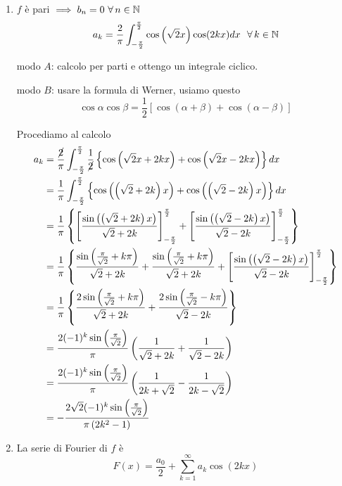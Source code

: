 \begin{enumerate}
\item $f$ è pari $\implies b_{n} = 0\ \forall n\in \NN $\begin{equation*}
a_{k} = \frac{2}{\pi }\int ^{\frac{\pi }{2}}_{ - \frac{\pi }{2}}\cos\left(\sqrt{2} x\right)\cos(2kx) dx\ \ \forall k\in \NN 
\end{equation*}

modo $A$: calcolo per parti e ottengo un integrale ciclico.

modo $B$: usare la formula di Werner, usiamo questo\begin{equation*}
\cos \alpha \cos \beta = \frac{1}{2}[\cos(\alpha + \beta) + \cos(\alpha - \beta)]
\end{equation*}

Procediamo al calcolo\begin{align*}
a_{k} & = \frac{\cancel{2}}{\pi }\int ^{\frac{\pi }{2}}_{ - \frac{\pi }{2}}\frac{1}{\cancel{2}}\left\{\cos\left(\sqrt{2} x + 2kx\right) + \cos\left(\sqrt{2} x - 2kx\right)\right\} dx\\
 & = \frac{1}{\pi }\int ^{\frac{\pi }{2}}_{ - \frac{\pi }{2}}\left\{\cos\left(\left(\sqrt{2} + 2k\right) x\right) + \cos\left(\left(\sqrt{2} - 2k\right) x\right)\right\} dx\\
 & = \frac{1}{\pi }\left\{\left[\frac{\sin\left(\left(\sqrt{2} + 2k\right) x\right)}{\sqrt{2} + 2k}\right]^{\frac{\pi }{2}}_{ - \frac{\pi }{2}} + \left[\frac{\sin\left(\left(\sqrt{2} - 2k\right) x\right)}{\sqrt{2} - 2k}\right]^{\frac{\pi }{2}}_{ - \frac{\pi }{2}}\right\}\\
 & = \frac{1}{\pi }\left\{\frac{\sin\left(\frac{\pi }{\sqrt{2}} + k\pi \right)}{\sqrt{2} + 2k} + \frac{\sin\left(\frac{\pi }{\sqrt{2}} + k\pi \right)}{\sqrt{2} + 2k} + \left[\frac{\sin\left(\left(\sqrt{2} - 2k\right) x\right)}{\sqrt{2} - 2k}\right]^{\frac{\pi }{2}}_{ - \frac{\pi }{2}}\right\}\\
 & = \frac{1}{\pi }\left\{\frac{2\sin\left(\frac{\pi }{\sqrt{2}} + k\pi \right)}{\sqrt{2} + 2k} + \frac{2\sin\left(\frac{\pi }{\sqrt{2}} - k\pi \right)}{\sqrt{2} - 2k}\right\}\\
 & = \frac{2(- 1)^{k}\sin\left(\frac{\pi }{\sqrt{2}}\right)}{\pi }\left(\frac{1}{\sqrt{2} + 2k} + \frac{1}{\sqrt{2} - 2k}\right)\\
 & = \frac{2(- 1)^{k}\sin\left(\frac{\pi }{\sqrt{2}}\right)}{\pi }\left(\frac{1}{2k + \sqrt{2}} - \frac{1}{2k - \sqrt{2}}\right)\\
 & = - \frac{2\sqrt{2}(- 1)^{k}\sin\left(\frac{\pi }{\sqrt{2}}\right)}{\pi \left(2k^{2} - 1\right)}
\end{align*}
\item La serie di Fourier di $f$ è\begin{equation*}
F(x) = \frac{a_{0}}{2} + \sum\limits ^{\infty }_{k = 1} a_{k}\cos(2kx)
\end{equation*}


\end{enumerate}
